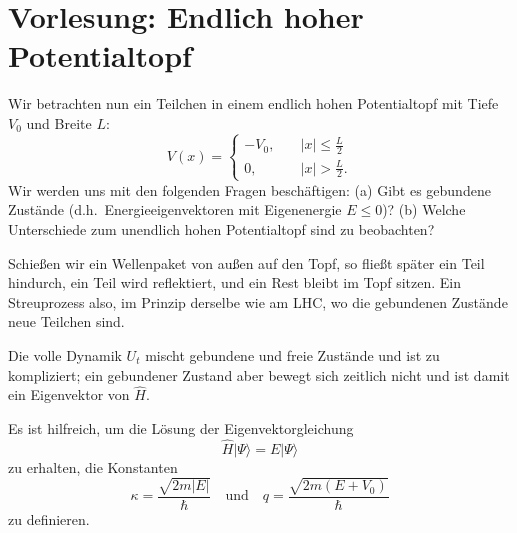 
\section{Vorlesung: Endlich hoher Potentialtopf}
Wir betrachten nun ein Teilchen in einem endlich hohen Potentialtopf mit Tiefe $V_0$ und Breite $L$:
\begin{equation}
	V(x) = \begin{cases}
		-V_0, \quad &|x|\le \frac{L}{2}\\
		0, \quad &|x| > \frac{L}{2}.
	\end{cases}
\end{equation}
Wir werden uns mit den folgenden Fragen beschäftigen: (a) Gibt es gebundene Zustände (d.h.\ Energieeigenvektoren mit Eigenenergie $E\le 0$)? (b) Welche Unterschiede zum unendlich hohen Potentialtopf sind zu beobachten?

\begin{intuition}
	Schießen wir ein Wellenpaket von außen auf den Topf, so fließt später ein Teil hindurch, ein Teil wird reflektiert, und ein Rest bleibt im Topf sitzen. Ein Streuprozess also, im Prinzip derselbe wie am LHC, wo die gebundenen Zustände neue Teilchen sind.
\end{intuition}

Die volle Dynamik $U_t$ mischt gebundene und freie Zustände und ist zu kompliziert; ein gebundener Zustand aber bewegt sich zeitlich nicht und ist damit ein Eigenvektor von $\widehat{H}$.

Es ist hilfreich, um die Lösung der Eigenvektorgleichung  
\begin{equation}
	\widehat{H}|\Psi\rangle = E|\Psi\rangle
\end{equation}
zu erhalten, die Konstanten
\begin{equation}
	\kappa = \frac{\sqrt{2m|E|}}{\hbar}\quad \text{und}\quad q = \frac{\sqrt{2m(E+V_0)}}{\hbar}
\end{equation}
zu definieren. 

